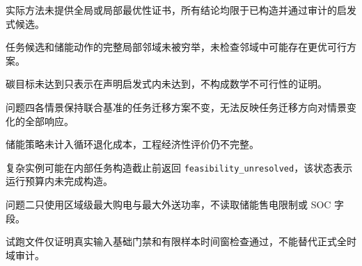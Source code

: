 实际方法未提供全局或局部最优性证书，所有结论均限于已构造并通过审计的启发式候选。

任务候选和储能动作的完整局部邻域未被穷举，未检查邻域中可能存在更优可行方案。

碳目标未达到只表示在声明启发式内未达到，不构成数学不可行性的证明。

问题四各情景保持联合基准的任务迁移方案不变，无法反映任务迁移方向对情景变化的全部响应。

储能策略未计入循环退化成本，工程经济性评价仍不完整。

复杂实例可能在内部任务构造截止前返回 \texttt{feasibility\_unresolved}，该状态表示运行预算内未完成构造。

问题二只使用区域级最大购电与最大外送功率，不读取储能售电限制或 SOC 字段。

试跑文件仅证明真实输入基础门禁和有限样本时间窗检查通过，不能替代正式全时域审计。
